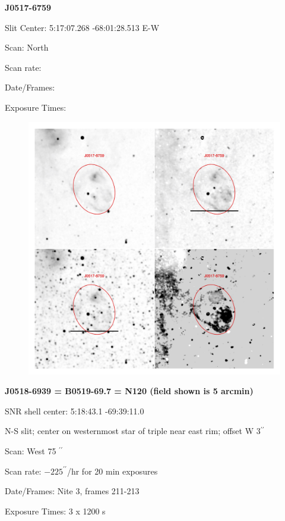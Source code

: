 \documentclass[11pt]{article}
\begin{document}
\newpage
{\bf J0517-6759}  
 
Slit Center:   5:17:07.268 -68:01:28.513    E-W 

Scan:  North

Scan rate:  

Date/Frames:

Exposure Times:  

\begin{figure}
\includegraphics[width=11.cm]{snapshots/J0517-6759.png}
\end{figure}

\newpage
{\bf J0518-6939 = B0519-69.7 = N120  (field shown is 5 arcmin)}  
 
SNR shell center:   5:18:43.1  -69:39:11.0   

N-S slit; center on westernmost star of triple near east rim; offset W 3$^{\prime\prime}$

Scan:  West  75 $^{\prime\prime}$

Scan rate:  $-225 ^{\prime\prime}$/hr for 20 min exposures

Date/Frames:  Nite 3, frames 211-213

Exposure Times:  3 x 1200 s
\end{document}
